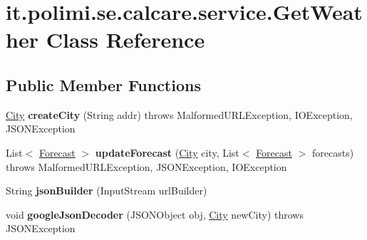 \hypertarget{classit_1_1polimi_1_1se_1_1calcare_1_1service_1_1GetWeather}{}\section{it.\+polimi.\+se.\+calcare.\+service.\+Get\+Weather Class Reference}
\label{classit_1_1polimi_1_1se_1_1calcare_1_1service_1_1GetWeather}
\subsection*{Public Member Functions}
\begin{DoxyCompactItemize}
\item 
\hypertarget{classit_1_1polimi_1_1se_1_1calcare_1_1service_1_1GetWeather_a8fbfe18f8715438086cc4cee3ba4680d}{}\hyperlink{classit_1_1polimi_1_1se_1_1calcare_1_1entities_1_1City}{City} {\bfseries create\+City} (String addr)  throws Malformed\+U\+R\+L\+Exception, I\+O\+Exception, J\+S\+O\+N\+Exception \label{classit_1_1polimi_1_1se_1_1calcare_1_1service_1_1GetWeather_a8fbfe18f8715438086cc4cee3ba4680d}

\item 
\hypertarget{classit_1_1polimi_1_1se_1_1calcare_1_1service_1_1GetWeather_ac1e81d436dd708ab46bdc7c92fce26b9}{}List$<$ \hyperlink{classit_1_1polimi_1_1se_1_1calcare_1_1entities_1_1Forecast}{Forecast} $>$ {\bfseries update\+Forecast} (\hyperlink{classit_1_1polimi_1_1se_1_1calcare_1_1entities_1_1City}{City} city, List$<$ \hyperlink{classit_1_1polimi_1_1se_1_1calcare_1_1entities_1_1Forecast}{Forecast} $>$ forecasts)  throws Malformed\+U\+R\+L\+Exception, J\+S\+O\+N\+Exception, I\+O\+Exception \label{classit_1_1polimi_1_1se_1_1calcare_1_1service_1_1GetWeather_ac1e81d436dd708ab46bdc7c92fce26b9}

\item 
\hypertarget{classit_1_1polimi_1_1se_1_1calcare_1_1service_1_1GetWeather_a4e1771ecd9db62feb3187696488edcb1}{}String {\bfseries json\+Builder} (Input\+Stream url\+Builder)\label{classit_1_1polimi_1_1se_1_1calcare_1_1service_1_1GetWeather_a4e1771ecd9db62feb3187696488edcb1}

\item 
\hypertarget{classit_1_1polimi_1_1se_1_1calcare_1_1service_1_1GetWeather_abf9661fb19282ffc9589e6bc1a9e8a26}{}void {\bfseries google\+Json\+Decoder} (J\+S\+O\+N\+Object obj, \hyperlink{classit_1_1polimi_1_1se_1_1calcare_1_1entities_1_1City}{City} new\+City)  throws J\+S\+O\+N\+Exception \label{classit_1_1polimi_1_1se_1_1calcare_1_1service_1_1GetWeather_abf9661fb19282ffc9589e6bc1a9e8a26}


\end{DoxyCompactItemize}
